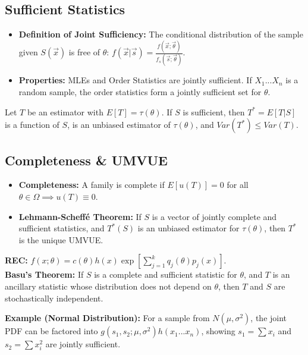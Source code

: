 \documentclass[12pt,a4paper]{article}
\begin{document}
\subsection{Sufficient Statistics}
\begin{itemize}
    \item \textbf{Definition of Joint Sufficiency:} The conditional distribution of the sample given $S(\vec{x})$ is free of $\theta$: $f(\vec{x}|\vec{s}) = \frac{f(\vec{x};\vec{\theta})}{f_s(\vec{s};\vec{\theta})}$.
    \item \textbf{Properties:} MLEs and Order Statistics are jointly sufficient. If $X_1...X_n$ is a random sample, the order statistics form a jointly sufficient set for $\theta$.
\end{itemize}

\begin{thmbox}[title=Rao-Blackwell Theorem]
Let $T$ be an estimator with $E[T] = \tau(\theta)$. If $S$ is sufficient, then $T^* = E[T|S]$ is a function of $S$, is an unbiased estimator of $\tau(\theta)$, and $Var(T^*) \le Var(T)$.
\end{thmbox}

\subsection{Completeness \& UMVUE}
\begin{itemize}
    \item \textbf{Completeness:} A family is complete if $E[u(T)]=0$ for all $\theta \in \Omega \implies u(T) \equiv 0$.
    \item \textbf{Lehmann-Scheffé Theorem:} If $S$ is a vector of jointly complete and sufficient statistics, and $T^*(S)$ is an unbiased estimator for $\tau(\theta)$, then $T^*$ is the unique UMVUE.
\end{itemize}

\begin{defbox}[title=Regular Exponential Class (REC) \& Basu's Theorem]
\textbf{REC:} $f(x;\theta) = c(\theta)h(x)\exp[\sum_{j=1}^k q_j(\theta)p_j(x)]$. \\
\textbf{Basu's Theorem:} If $S$ is a complete and sufficient statistic for $\theta$, and $T$ is an ancillary statistic whose distribution does not depend on $\theta$, then $T$ and $S$ are stochastically independent.
\end{defbox}

\textbf{Example (Normal Distribution):} For a sample from $N(\mu, \sigma^2)$, the joint PDF can be factored into $g(s_1,s_2;\mu,\sigma^2)h(x_1...x_n)$, showing $s_1=\sum x_i$ and $s_2=\sum x_i^2$ are jointly sufficient.
\end{document}

